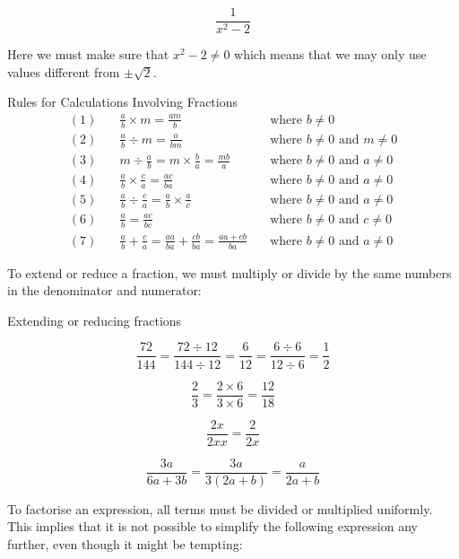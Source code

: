 \begin{example}

\[
\frac{1}{x^2 - 2}
\]    
\end{example}

Here we must make sure that \(x^2 - 2 \neq 0\) which means that we may only use values different from \(\pm\sqrt{2}\).
\begin{custombox}{Rules for Calculations Involving Fractions}
    \begin{align*}
        (1) & \quad \frac{a}{b} \times m = \frac{am}{b} \quad &\text{where } b \neq 0 \\
        (2) & \quad \frac{a}{b} \div m = \frac{a}{bm} \quad &\text{where } b \neq 0 \text{ and } m \neq 0 \\
        (3) & \quad m \div \frac{a}{b} = m \times \frac{b}{a} = \frac{mb}{a} \quad &\text{where } b \neq 0 \text{ and } a \neq 0 \\
        (4) & \quad \frac{a}{b} \times \frac{c}{a} = \frac{ac}{ba} \quad &\text{where } b \neq 0 \text{ and } a \neq 0 \\
        (5) & \quad \frac{a}{b} \div \frac{c}{a} = \frac{a}{b} \times \frac{a}{c} \quad &\text{where } b \neq 0 \text{ and } a \neq 0 \\
        (6) & \quad \frac{a}{b} = \frac{ac}{bc} \quad &\text{where } b \neq 0 \text{ and } c \neq 0 \\
        (7) & \quad \frac{a}{b} + \frac{c}{a} = \frac{aa}{ba} + \frac{cb}{ba} = \frac{aa + cb}{ba} \quad &\text{where } b \neq 0 \text{ and } a \neq 0
    \end{align*}
\end{custombox}

To extend or reduce a fraction, we must multiply or divide by the same numbers in the denominator and numerator:

\begin{example} Extending or reducing fractions

\[
\frac{72}{144} = \frac{72 \div 12}{144 \div 12} = \frac{6}{12} = \frac{6 \div 6}{12 \div 6} = \frac{1}{2}
\]

\[
\frac{2}{3} = \frac{2 \times 6}{3 \times 6} = \frac{12}{18}
\]

\[
\frac{2x}{2xx} = \frac{2}{2x}
\]

\[
\frac{3a}{6a + 3b} = \frac{3a}{3(2a + b)} = \frac{a}{2a + b}
\]    
\end{example}

To factorise an expression, all terms must be divided or multiplied uniformly. This implies that it is not possible to simplify the following expression any further, even though it might be tempting:

